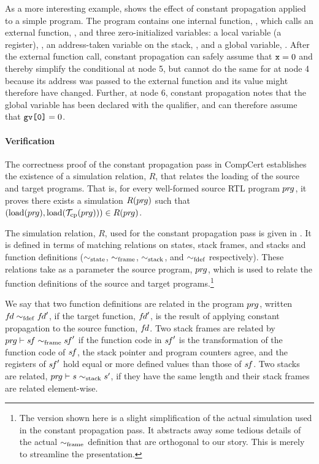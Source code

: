 As a more interesting example, 
 shows the effect of constant propagation applied to a simple program.
The program contains one internal function, , which calls an external function, ,
and three zero-initialized variables: 
a local variable (a register), , 
an address-taken variable on the stack, ,
and a global variable, .
After the external function call, 
constant propagation can safely assume that $\texttt{x}=0$ and thereby simplify the conditional at node 5,
but cannot do the same for  at node 4
because its address was passed to the external function and its value might therefore have changed.
Further, at node 6, 
constant propagation notes that the global variable  has been declared with the  qualifier,
and can therefore assume that $\texttt{gv[0]}=0$.






\paragraph{Verification}

The correctness proof of the constant propagation pass in CompCert establishes 
the existence of a simulation relation, $R$, that relates the loading of the source and target programs.
That is, for every well-formed source RTL program ${pr\hspace*{-1pt}g}$, it proves 
there exists a simulation $R({pr\hspace*{-1pt}g})$ such that 
$(\mathrm{load}({pr\hspace*{-1pt}g}),\mathrm{load}(\mathcal{T}_\mathrm{cp}({pr\hspace*{-1pt}g})))\in R({pr\hspace*{-1pt}g})$.

The simulation relation, $R$, used for the constant propagation pass is given in
.  It is defined in terms of matching relations on states, stack frames,
and stacks and function definitions ($\sim_{\mathrm{state}}$, $\sim_{\mathrm{frame}}$, $\sim_{\mathrm{stack}}$, and $\sim_{\mathrm{fdef}}$
respectively).  These relations take as a parameter the source program, ${pr\hspace*{-1pt}g}$, which is used to
relate the function definitions of the source and target programs.\footnote{The version shown here
  is a slight simplification of the actual simulation used in the constant propagation pass.  It
  abstracts away some tedious details of the actual $\sim_{\mathrm{frame}}$ definition that are orthogonal to
  our story.  This is merely to streamline the presentation.}

We say that two function definitions are related in the program ${pr\hspace*{-1pt}g}$, written ${f\hspace*{-1pt}d} \sim_{\mathrm{fdef}} {f\hspace*{-1pt}d}'$, 
if the target function, ${f\hspace*{-1pt}d}'$, is the result of applying constant propagation to the source function, ${f\hspace*{-1pt}d}$.
Two stack frames are related by ${pr\hspace*{-1pt}g} \vdash {s\hspace*{-1pt}f}\sim_{\mathrm{frame}} {s\hspace*{-1pt}f}'$ if 
the function code in ${s\hspace*{-1pt}f}'$ is the transformation of the function code of ${s\hspace*{-1pt}f}$,
the stack pointer and program counters agree, and
the registers of ${s\hspace*{-1pt}f}'$ hold equal or more defined values than those of ${s\hspace*{-1pt}f}$.
Two stacks are related, ${pr\hspace*{-1pt}g} \vdash s\sim_{\mathrm{stack}} s'$, if they have the same length and their stack frames are related element-wise.


